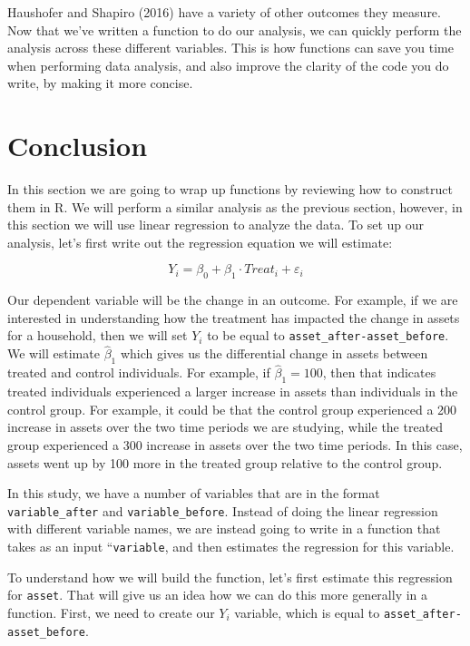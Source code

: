 \documentclass[
]{book}
\begin{document}
Haushofer and Shapiro (2016) have a variety of other outcomes they measure. Now that we've written a function to do our analysis, we can quickly perform the analysis across these different variables. This is how functions can save you time when performing data analysis, and also improve the clarity of the code you do write, by making it more concise.

\section{Conclusion}\label{conclusion-8}

In this section we are going to wrap up functions by reviewing how to construct them in R. We will perform a similar analysis as the previous section, however, in this section we will use linear regression to analyze the data. To set up our analysis, let's first write out the regression equation we will estimate:

\[
Y_i = \beta_0 + \beta_1 \cdot Treat_i + \varepsilon_i
\]

Our dependent variable will be the change in an outcome. For example, if we are interested in understanding how the treatment has impacted the change in assets for a household, then we will set \(Y_i\) to be equal to \texttt{asset\_after-asset\_before}. We will estimate \(\hat{\beta}_1\) which gives us the differential change in assets between treated and control individuals. For example, if \(\hat{\beta}_1=100\), then that indicates treated individuals experienced a larger increase in assets than individuals in the control group. For example, it could be that the control group experienced a 200 increase in assets over the two time periods we are studying, while the treated group experienced a 300 increase in assets over the two time periods. In this case, assets went up by 100 more in the treated group relative to the control group.

In this study, we have a number of variables that are in the format \texttt{variable\_after} and \texttt{variable\_before}. Instead of doing the linear regression with different variable names, we are instead going to write in a function that takes as an input ``\texttt{variable\textquotesingle{}\textquotesingle{}}, and then estimates the regression for this variable.

To understand how we will build the function, let's first estimate this regression for \texttt{asset}. That will give us an idea how we can do this more generally in a function. First, we need to create our \(Y_i\) variable, which is equal to \texttt{asset\_after-asset\_before}.
\end{document}
